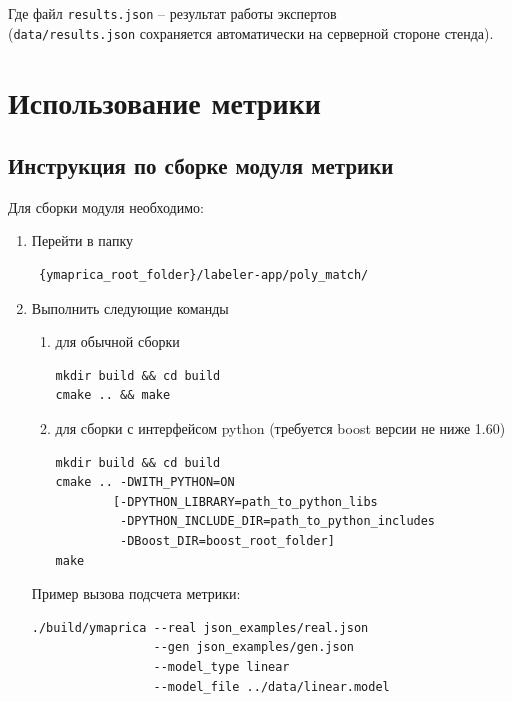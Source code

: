 \documentclass[12pt]{article}
\begin{document}
Где файл \texttt{results.json} -- результат работы экспертов\\
{(\small \texttt{data/results.json} сохраняется автоматически на серверной стороне стенда)}.

\section{Использование метрики}
\label{metrica-usage}

\subsection{Инструкция по сборке модуля метрики}
Для сборки модуля необходимо:

\begin{enumerate}
\item Перейти в папку
\begin{verbatim} {ymaprica_root_folder}/labeler-app/poly_match/ \end{verbatim}

\item Выполнить следующие команды
\begin{enumerate}

\item для обычной сборки
\begin{verbatim}
mkdir build && cd build
cmake .. && make
\end{verbatim}

\item для сборки с интерфейсом python (требуется boost версии не ниже 1.60)
\begin{verbatim}
mkdir build && cd build
cmake .. -DWITH_PYTHON=ON
        [-DPYTHON_LIBRARY=path_to_python_libs
         -DPYTHON_INCLUDE_DIR=path_to_python_includes
         -DBoost_DIR=boost_root_folder]
make
\end{verbatim}

\end{enumerate}

Пример вызова подсчета метрики:
\begin{verbatim}
./build/ymaprica --real json_examples/real.json
                 --gen json_examples/gen.json
                 --model_type linear
                 --model_file ../data/linear.model
\end{verbatim}

\end{enumerate}
\end{document}
